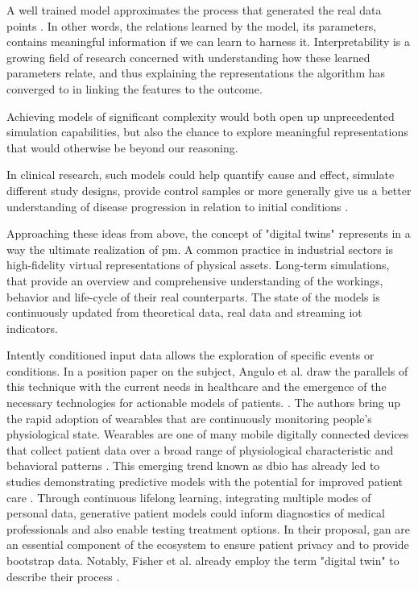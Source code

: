             A well trained model approximates the process that generated the real data points \cite{esteban2017real}. In other words, the relations learned by the model, its parameters, contains meaningful information if we can learn to harness it. Interpretability is a growing field of research concerned with understanding how these learned parameters relate, and thus explaining the representations the algorithm has converged to in linking the features to the outcome.\par
            Achieving models of significant complexity would both open up unprecedented simulation capabilities, but also the chance to explore meaningful representations that would otherwise be beyond our reasoning.\par 
            In clinical research, such models could help quantify cause and effect, simulate different study designs, provide control samples or more generally give us a better understanding of disease progression in relation to initial conditions \cite{Fisher2019, yahi2017generative, walsh2020generating}.\par
            
            Approaching these ideas from above, the concept of "digital twins" represents in a way the ultimate realization of \gls{pm}. A common practice in industrial sectors is high-fidelity virtual representations of physical assets. Long-term simulations, that provide an overview and comprehensive understanding of the workings, behavior and life-cycle of their real counterparts. The state of the models is continuously updated from theoretical data, real data and streaming \gls{iot} indicators.\par
            Intently conditioned input data allows the exploration of specific events or conditions. In a position paper on the subject, Angulo et al. draw the parallels of this technique with the current needs in healthcare and the emergence of the necessary technologies for actionable models of patients. \cite{angulo2019towards,Angulo_2020}. The authors bring up the rapid adoption of wearables that are continuously monitoring people's physiological state. 
            Wearables are one of many mobile digitally connected devices that collect patient data over a broad range of physiological characteristic and behavioral patterns \cite{coravos2019developing}. This emerging trend known as \gls{dbio} has already led to studies demonstrating predictive models with the potential for improved patient care \cite{snyder2018best}. Through continuous lifelong learning, integrating  multiple modes of personal data, generative patient models could inform diagnostics of medical professionals and also enable testing treatment options. In their proposal, \gls{gan} are an essential component of the ecosystem to ensure patient privacy and to provide bootstrap data. Notably, Fisher et al. already employ the term "digital twin" to describe their process \cite{walsh2020generating}.
        
